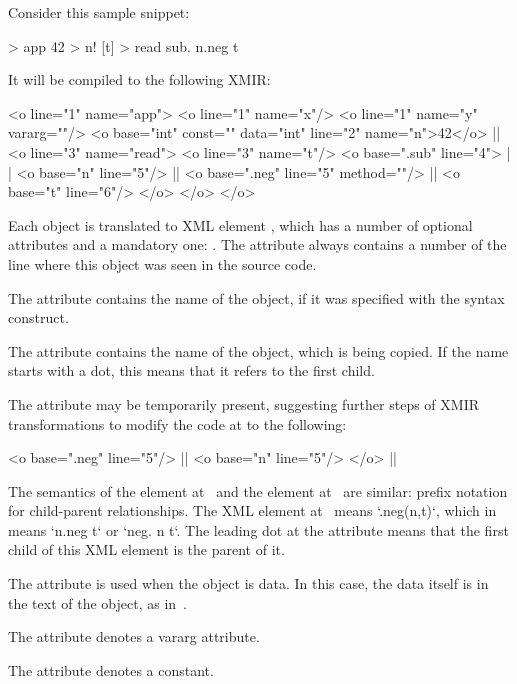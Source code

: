 Consider this sample \eo{} snippet:

\begin{ffcode}
[x y...] > app
  42 > n!
  [t] > read
    sub.
      n.neg
      t
\end{ffcode}

It will be compiled to the following XMIR:

\begin{ffcode}
<o line="1" name="app">
  <o line="1" name="x"/>
  <o line="1" name="y" vararg=""/>
  <o base="int" const="" data="int"
    line="2" name="n">42</o>   |$\label{ln:xml-data}$|
  <o line="3" name="read">
    <o line="3" name="t"/>
    <o base=".sub" line="4"> |$\label{ln:xml-sub}$|
      <o base="n" line="5"/> |$\label{ln:method-start}$|
      <o base=".neg" line="5" method=""/>  |$\label{ln:method-end}$|
      <o base="t" line="6"/>
    </o>
  </o>
</o>
\end{ffcode}

Each object is translated to XML element , which has
a number of optional attributes and a mandatory one: .
The attribute  always contains a number of the
line where this object was seen in the source code.

The attribute  contains the name of the object, if
it was specified with the \ff{>} syntax construct.

The attribute  contains the name of the object, which
is being copied. If the name starts with a dot, this means
that it refers to the first  child.

The attribute  may be temporarily present, suggesting
further steps of XMIR transformations to modify the code
at  to the following:

\begin{ffcode}
<o base=".neg" line="5"/> |$\label{ln:xml-neg}$|
  <o base="n" line="5"/>
</o>  |$\label{ln:xml-neg-end}$|
\end{ffcode}

The semantics of the element  at~
and the element  at~ are similar: prefix
notation for child-parent relationships. The XML element at~
means `.neg(n,t)`, which in~\eo{} means `n.neg t` or `neg. n t`. The
leading dot at the attribute  means that the first
child of this XML element is the \eo{} parent of it.

The attribute  is used when the object is data. In this
case, the data itself is in the text of the object, as in~.

The attribute  denotes a vararg attribute.

The attribute  denotes a constant.
